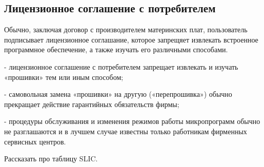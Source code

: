 \subsection{Лицензионное соглашение с потребителем}
Обычно, заключая договор с производителем материнских плат,
	пользователь подписывает лицензионное соглашание,
		которое запрещяет извлекать встроенное программное обеспечение, а также изучать его различными способами.


 - лицензионное соглашение с потребителем запрещает извлекать и изучать «прошивки» тем или иным способом;

 - самовольная замена «прошивки» на другую («перепрошивка») обычно прекращает действие гарантийных обязательств фирмы;

 - процедуры обслуживания и изменения режимов работы микропрограмм обычно не разглашаются и в лучшем случае известны только работникам фирменных сервисных центров.


Рассказать про таблицу SLIC.
